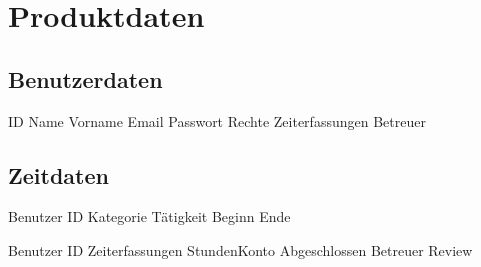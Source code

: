 \section{Produktdaten}

\subsection{Benutzerdaten}
\begin{requirements}
	\begin{requirements}
		 ID
		 Name
		 Vorname
		 Email
		 Passwort
		 Rechte
		 Zeiterfassungen
		 Betreuer
	\end{requirements}
\end{requirements}

\subsection{Zeitdaten}
\begin{requirements}
	\req [Zeiterfassung] {D20}
	\begin{requirements}
		 Benutzer ID
		 Kategorie
		 Tätigkeit
		 Beginn
		 Ende
	\end{requirements}

	\req [Stundenzettel] {D30}
	\begin{requirements}
		 Benutzer ID
		 Zeiterfassungen
		 StundenKonto
		 Abgeschlossen
		 Betreuer Review
	\end{requirements}
\end{requirements}


